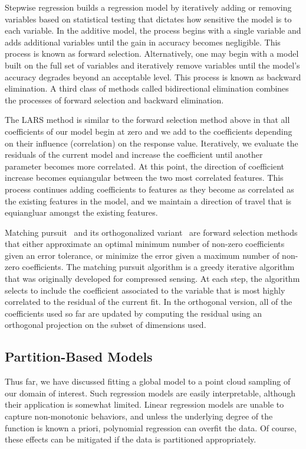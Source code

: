Stepwise regression builds a regression model by iteratively adding or removing variables based on statistical testing that dictates how sensitive the model is to each variable.
%
In the additive model, the process begins with a single variable and adds additional variables until the gain in accuracy becomes negligible.
%
This process is known as forward selection.
%
Alternatively, one may begin with a model built on the full set of variables and iteratively remove variables until the model's accuracy degrades beyond an acceptable level.
%
This process is known as backward elimination.
%
A third class of methods called bidirectional elimination combines the processes of forward selection and backward elimination.

The LARS method is similar to the forward selection method above in that all coefficients of our model begin at zero and we add to the coefficients depending on their influence (correlation) on the response value.
%
Iteratively, we evaluate the residuals of the current model and increase the coefficient until another parameter becomes more correlated.
%
At this point, the direction of coefficient increase becomes equiangular between the two most correlated features.
%
This process continues adding coefficients to features as they become as correlated as the existing features in the model,
and we maintain a direction of travel that is equiangluar amongst the existing features.

Matching pursuit~\cite{MallatZhang1993} and its orthogonalized variant~\cite{DavisMallatZhang1994,PatiRezaiifarKrishnaprasad1993} are forward selection methods that either approximate an optimal minimum number of non-zero coefficients given an error tolerance, or minimize the error given a maximum number of non-zero coefficients.
%
The matching pursuit algorithm is a greedy iterative algorithm that was originally developed for compressed sensing.
%
At each step, the algorithm selects to include the coefficient associated to the variable that is most highly correlated to the residual of the current fit.
%
In the orthogonal version, all of the coefficients used so far are updated by computing the residual using an orthogonal projection on the subset of dimensions used.

\subsection{Partition-Based Models}
Thus far, we have discussed fitting a global model to a point cloud sampling of our domain of interest.
%
Such regression models are easily interpretable, although their application is somewhat limited.
%
Linear regression models are unable to capture non-monotonic behaviors, and unless the underlying degree of the function is known a priori, polynomial regression can overfit the data.
%
Of course, these effects can be mitigated if the data is partitioned appropriately.

